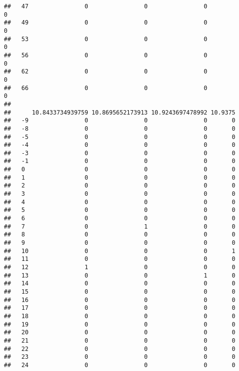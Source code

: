 \documentclass[]{article}
\begin{document}
\begin{verbatim}
##   47                0                0                0                0
##   49                0                0                0                0
##   53                0                0                0                0
##   56                0                0                0                0
##   62                0                0                0                0
##   66                0                0                0                0
##     
##      10.8433734939759 10.8695652173913 10.9243697478992 10.9375
##   -9                0                0                0       0
##   -8                0                0                0       0
##   -5                0                0                0       0
##   -4                0                0                0       0
##   -3                0                0                0       0
##   -1                0                0                0       0
##   0                 0                0                0       0
##   1                 0                0                0       0
##   2                 0                0                0       0
##   3                 0                0                0       0
##   4                 0                0                0       0
##   5                 0                0                0       0
##   6                 0                0                0       0
##   7                 0                1                0       0
##   8                 0                0                0       0
##   9                 0                0                0       0
##   10                0                0                0       1
##   11                0                0                0       0
##   12                1                0                0       0
##   13                0                0                1       0
##   14                0                0                0       0
##   15                0                0                0       0
##   16                0                0                0       0
##   17                0                0                0       0
##   18                0                0                0       0
##   19                0                0                0       0
##   20                0                0                0       0
##   21                0                0                0       0
##   22                0                0                0       0
##   23                0                0                0       0
##   24                0                0                0       0

\end{verbatim}
\end{document}
